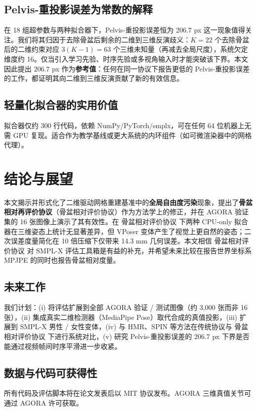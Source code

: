 \documentclass[a4paper,11pt]{article}
\newcommand{\prp}{骨盆相对评价协议}
\begin{document}
\subsection{Pelvis-重投影误差为常数的解释}
在 18 组超参数与两种拟合器下，Pelvis-重投影误差恒为 206.7 px 这一现象值得关注。我们将其归因于去除骨盆后剩余的二维到三维反演歧义：$K=22$ 个去除骨盆后的二维约束对应 $3(K-1)=63$ 个三维未知量（再减去全局尺度），系统欠定维度约 16。仅当引入学习先验、时序先验或多视角输入时才能突破该下界。本文因此提出 $206.7$ px 作为\textbf{参考值}：任何在同一协议下报告更低的 Pelvis-重投影误差的工作，都证明其向二维到三维反演贡献了新的有效信息。

\subsection{轻量化拟合器的实用价值}
拟合器仅约 300 行代码，依赖 NumPy/PyTorch/smplx，可在任何 64 位机器上无需 GPU 复现。适合作为教学基线或更大系统的内环组件（如可微渲染器中的网格代理）。

\section{结论与展望}
\label{sec:conclusion}

本文揭示并形式化了二维驱动网格重建基准中的\textbf{全局自由度污染}现象，提出了\textbf{骨盆相对再评价协议}（\prp）作为方法学上的修正，并在 AGORA 验证集的 16 张图像上演示了其有效性。在 \prp{} 下两种 CPU-only 拟合器在三维姿态上统计无显著差异，但 VPoser 变体产生了视觉上更自然的姿态；二次误差度量简化在 10 倍压缩下仅带来 14.3 mm 几何误差。本文相信 \prp{} 对 SMPL-X 评估工具箱是有益的补充，并希望未来比较在报告世界坐标系 MPJPE 的同时也报告骨盆相对度量。

\subsection*{未来工作}
我们计划：(i) 将评估扩展到全部 AGORA 验证 / 测试图像（约 3{,}000 张而非 16 张），(ii) 集成真实二维检测器（MediaPipe Pose）取代合成的真值投影，(iii) 扩展到 SMPL-X 男性 / 女性变体，(iv) 与 HMR、SPIN 等方法在传统协议与 \prp{} 下进行系统对比，(v) 研究 Pelvis-重投影误差的 206.7 px 下界是否能通过视频帧间时序平滑进一步收紧。

\subsection*{数据与代码可获得性}
所有代码及评估脚本将在论文发表后以 MIT 协议发布。AGORA 三维真值关节可通过 AGORA 许可获取。
\end{document}

